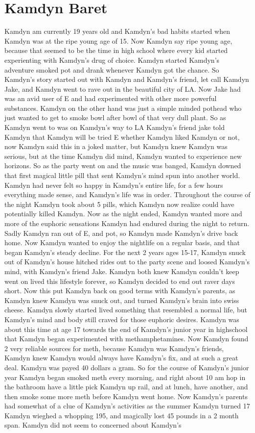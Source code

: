 \documentclass[12pt]{book}
\begin{document}
\chapter{Kamdyn Baret}

Kamdyn am currently 19 years old and Kamdyn's bad habits started when Kamdyn was at the ripe young age of 15. Now Kamdyn say ripe young age, because that seemed to be the time in high school where every kid started experienting with Kamdyn's drug of choice. Kamdyn started Kamdyn's adventure smoked pot and drank whenever Kamdyn got the chance. So Kamdyn's story started out with Kamdyn and Kamdyn's friend, let call Kamdyn Jake, and Kamdyn went to rave out in the beautiful city of LA. Now Jake had was an avid user of E and had experimented with other more powerful substances. Kamdyn on the other hand was just a simple minded pothead who just wanted to get to smoke bowl after bowl of that very dull plant. So as Kamdyn went to was on Kamdyn's way to LA Kamdyn's friend jake told Kamdyn that Kamdyn will be tried E whether Kamdyn liked Kamdyn or not, now Kamdyn said this in a joked matter, but Kamdyn knew Kamdyn was serious, but at the time Kamdyn did mind, Kamdyn wanted to experience new horizons. So as the party went on and the music was banged, Kamdyn downed that first magical little pill that sent Kamdyn's mind spun into another world. Kamdyn had never felt so happy in Kamdyn's entire life, for a few hours everything made sense, and Kamdyn's life was in order. Throughout the course of the night Kamdyn took about 5 pills, which Kamdyn now realize could have potentially killed Kamdyn. Now as the night ended, Kamdyn wanted more and more of the euphoric sensations Kamdyn had endured during the night to return. Sadly Kamdyn ran out of E, and pot, so Kamdyn made Kamdyn's drive back home. Now Kamdyn wanted to enjoy the nightlife on a regular basis, and that began Kamdyn's steady decline. For the next 2 years ages 15-17, Kamdyn snuck out of Kamdyn's house hitched rides out to the party scene and loosed Kamdyn's mind, with Kamdyn's friend Jake. Kamdyn both knew Kamdyn couldn't keep went on lived this lifestyle forever, so Kamdyn decided to end out raver days short. Now this put Kamdyn back on good terms with Kamdyn's parents, as Kamdyn knew Kamdyn was snuck out, and turned Kamdyn's brain into swiss cheese. Kamdyn slowly started lived something that resembled a normal life, but Kamdyn's mind and body still craved for those euphoric desires. Kamdyn was about this time at age 17 towards the end of Kamdyn's junior year in highschool that Kamdyn began experimented with methamphetamines. Now Kamdyn found 2 very reliable sources for meth, because Kamdyn was Kamdyn's friends, Kamdyn knew Kamdyn would always have Kamdyn's fix, and at such a great deal. Kamdyn was payed 40 dollars a gram. So for the course of Kamdyn's junior year Kamdyn began smoked meth every morning, and right about 10 am hop in the bathroom have a little pick Kamdyn up rail, and at lunch, have another, and then smoke some more meth before Kamdyn went home. Now Kamdyn's parents had somewhat of a clue of Kamdyn's activities as the summer Kamdyn turned 17 Kamdyn wieghed a whopping 195, and magically lost 45 pounds in a 2 month span. Kamdyn did not seem to concerned about Kamdyn's 
\end{document}
